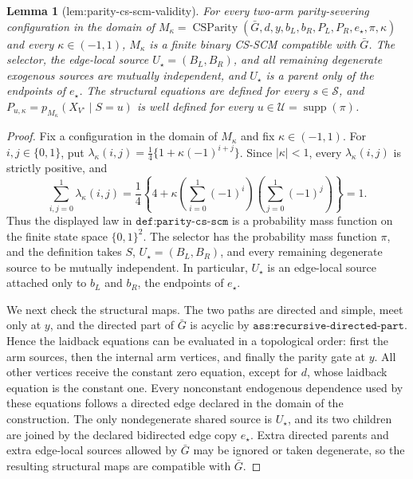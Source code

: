 \documentclass{article}
\newtheorem{lemma}{Lemma}
\begin{document}
\begin{lemma}[lem:parity-cs-scm-validity]\label{lem:parity-cs-scm-validity}
For every two-arm parity-severing configuration in the domain of \(M_\kappa=\operatorname{CSParity}(\bar G,d,y,b_L,b_R,P_L,P_R,e_\star,\pi,\kappa)\) and every \(\kappa\in(-1,1)\), \(M_\kappa\) is a finite binary CS-SCM compatible with \(\bar G\). The selector, the edge-local source \(U_\star=(B_L,B_R)\), and all remaining degenerate exogenous sources are mutually independent, and \(U_\star\) is a parent only of the endpoints of \(e_\star\). The structural equations are defined for every \(s\in\mathcal S\), and \(P_{u,\kappa}=p_{M_\kappa}(X_{V^\circ}\mid S=u)\) is well defined for every \(u\in\mathcal U=\operatorname{supp}(\pi)\).
\end{lemma}
\begin{proof}
Fix a configuration in the domain of \(M_\kappa\) and fix \(\kappa\in(-1,1)\). For \(i,j\in\{0,1\}\), put \(\lambda_\kappa(i,j)=\tfrac14\{1+\kappa(-1)^{i+j}\}\). Since \(|\kappa|<1\), every \(\lambda_\kappa(i,j)\) is strictly positive, and
\[
\sum_{i,j=0}^1\lambda_\kappa(i,j)=\frac14\left\{4+\kappa\left(\sum_{i=0}^1(-1)^i\right)\left(\sum_{j=0}^1(-1)^j\right)\right\}=1.
\]
Thus the displayed law in \(\texttt{def:parity-cs-scm}\) is a probability mass function on the finite state space \(\{0,1\}^2\). The selector has the probability mass function \(\pi\), and the definition takes \(S\), \(U_\star=(B_L,B_R)\), and every remaining degenerate source to be mutually independent. In particular, \(U_\star\) is an edge-local source attached only to \(b_L\) and \(b_R\), the endpoints of \(e_\star\).

We next check the structural maps. The two paths are directed and simple, meet only at \(y\), and the directed part of \(\bar G\) is acyclic by \(\texttt{ass:recursive-directed-part}\). Hence the laidback equations can be evaluated in a topological order: first the arm sources, then the internal arm vertices, and finally the parity gate at \(y\). All other vertices receive the constant zero equation, except for \(d\), whose laidback equation is the constant one. Every nonconstant endogenous dependence used by these equations follows a directed edge declared in the domain of the construction. The only nondegenerate shared source is \(U_\star\), and its two children are joined by the declared bidirected edge copy \(e_\star\). Extra directed parents and extra edge-local sources allowed by \(\bar G\) may be ignored or taken degenerate, so the resulting structural maps are compatible with \(\bar G\).


\end{proof}
\end{document}

